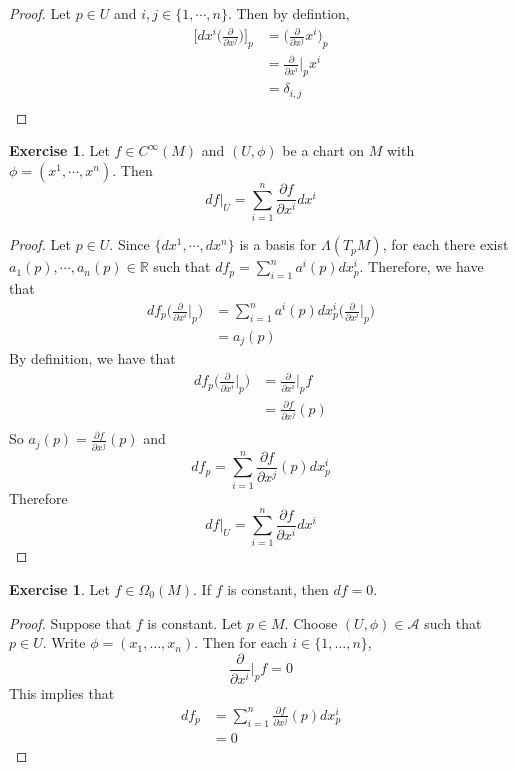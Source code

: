 \documentclass{book}
\theoremstyle{definition}
\newtheorem{ex}[definition]{Exercise}
\newcommand{\del}{\delta}
\newcommand{\Lam}{\Lambda}
\newcommand{\Om}{\Omega}
\newcommand{\R}{\mathbb{R}}
\newcommand{\MA}{\mathcal{A}}
\DeclareMathOperator*{\0}{\mbf{0}}
\DeclareMathOperator*{\1}{\mbf{1}}
\newcommand{\p}{\partial}
\begin{document}
	\begin{proof}
		Let $p \in U$ and $i,j \in \{1, \cdots, n\}$. Then  by defintion,
		\begin{align*}
			\bigg[ dx^i \bigg (\frac{\p}{\p x^j} \bigg ) \bigg]_p 
			&= \bigg(\frac{\p}{\p x^j} x^i \bigg )_p \\
			&= \frac{\p}{\p x^i} \bigg|_p x^i \\
			&= \del_{i,j} \\
		\end{align*}
	\end{proof}

	\begin{ex}
		Let $f \in C^{\infty}(M)$ and $(U, \phi)$ be a chart on $M$ with $\phi = (x^1, \cdots, x^n)$. Then $$df|_U = \sum_{i=1}^n \frac{\p f}{\p x^i} dx^i$$
	\end{ex}

	\begin{proof}
		Let $p \in U$. Since $\{dx^1, \cdots, dx^n\}$ is a basis for $\Lam(T_pM)$, for each there exist $a_1(p), \cdots, a_n(p) \in \R$ such that $df_p = \sum\limits_{i=1}^n a^i(p)dx^i_p$. Therefore, we have that 
		\begin{align*}
			df_p \bigg(\frac{\p}{\p x^i} \bigg|_p \bigg) 
			&= \sum\limits_{i=1}^n a^i(p)dx^i_p \bigg(\frac{\p}{\p x^i} \bigg|_p \bigg)  \\
			&=  a_j(p)
		\end{align*}
		By definition, we have that 
		\begin{align*}
			df_p\bigg(\frac{\p}{\p x^i} \bigg|_p \bigg) 
			&= \frac{\p}{\p x^i} \bigg|_p f \\ 
			&= \frac{\p f}{\p x^j} (p)\\
		\end{align*}
		So $a_j(p) = \frac{\p f}{\p x^j} (p)$ and $$df_p = \sum\limits_{i=1}^n \frac{\p f}{\p x^j} (p)dx^i_p$$
		Therefore $$df|_U = \sum\limits_{i=1}^n {\frac{\p f}{\p x^i}}dx^i$$
	\end{proof}
	
	\begin{ex}
	Let $f \in \Om_0(M)$. If $f$ is constant, then $df = 0$. 
	\end{ex}
	
	\begin{proof}
	Suppose that $f$ is constant. Let $p \in M$. Choose $(U, \phi) \in \MA$ such that $p \in U$. Write $\phi = (x_1, \dots, x_n)$. Then for each $i \in \{1, \dots, n\}$, $$\frac{\p}{\p x^i} \bigg|_p f = 0$$ This implies that 
	\begin{align*}
	df_p 
	&= \sum\limits_{i=1}^n \frac{\p f}{\p x^j} (p)dx^i_p \\
	&= 0
	\end{align*}
	\end{proof}
	
\end{document}
